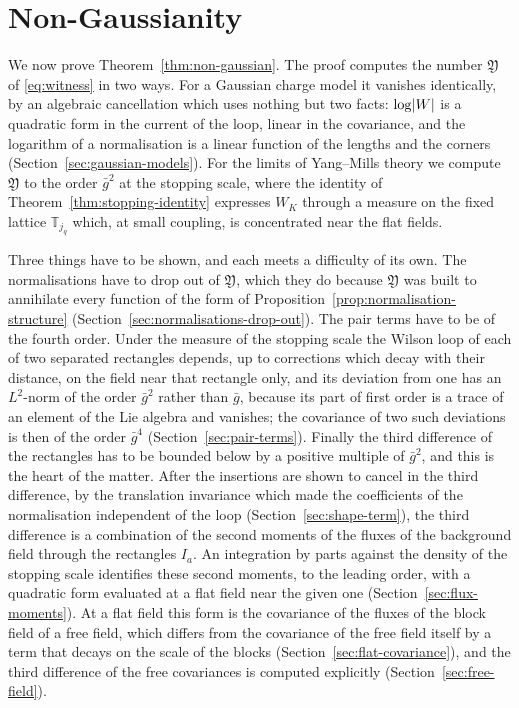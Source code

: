 \documentclass[11pt]{preprint}
\DeclarePairedDelimiter{\abs}{\lvert}{\rvert}
\numberwithin{equation}{section}
\theoremstyle{definition}
\theoremstyle{remark}
\theoremstyle{plain}
\begin{document}
\section{Non-Gaussianity}\label{sec:non-gaussianity}

We now prove Theorem~\ref{thm:non-gaussian}. The proof computes the number $\mathfrak Y$ of \eqref{eq:witness} in two ways. For a Gaussian charge model it vanishes identically, by an algebraic cancellation which uses nothing but two facts: $\log\abs{W}$ is a quadratic form in the current of the loop, linear in the covariance, and the logarithm of a normalisation is a linear function of the lengths and the corners (Section~\ref{sec:gaussian-models}). For the limits of Yang--Mills theory we compute $\mathfrak Y$ to the order $\bar g^2$ at the stopping scale, where the identity of Theorem~\ref{thm:stopping-identity} expresses $W_K$ through a measure on the fixed lattice $\mathbb T_{j_q}$ which, at small coupling, is concentrated near the flat fields.

Three things have to be shown, and each meets a difficulty of its own. The normalisations have to drop out of $\mathfrak Y$, which they do because $\mathfrak Y$ was built to annihilate every function of the form of Proposition~\ref{prop:normalisation-structure} (Section~\ref{sec:normalisations-drop-out}). The pair terms have to be of the fourth order. Under the measure of the stopping scale the Wilson loop of each of two separated rectangles depends, up to corrections which decay with their distance, on the field near that rectangle only, and its deviation from one has an $L^2$-norm of the order $\bar g^2$ rather than $\bar g$, because its part of first order is a trace of an element of the Lie algebra and vanishes; the covariance of two such deviations is then of the order $\bar g^4$ (Section~\ref{sec:pair-terms}). Finally the third difference of the rectangles has to be bounded below by a positive multiple of $\bar g^2$, and this is the heart of the matter. After the insertions are shown to cancel in the third difference, by the translation invariance which made the coefficients of the normalisation independent of the loop (Section~\ref{sec:shape-term}), the third difference is a combination of the second moments of the fluxes of the background field through the rectangles $I_a$. An integration by parts against the density of the stopping scale identifies these second moments, to the leading order, with a quadratic form evaluated at a flat field near the given one (Section~\ref{sec:flux-moments}). At a flat field this form is the covariance of the fluxes of the block field of a free field, which differs from the covariance of the free field itself by a term that decays on the scale of the blocks (Section~\ref{sec:flat-covariance}), and the third difference of the free covariances is computed explicitly (Section~\ref{sec:free-field}).
\end{document}
